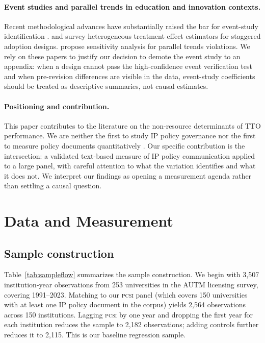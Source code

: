 \documentclass[12pt]{article}
\newcommand{\PCSI}{\textsc{pcsi}}
\begin{document}
\paragraph{Event studies and parallel trends in education and innovation contexts.}
Recent methodological advances have substantially raised the bar for event-study
identification \citep{callaway2021, sunabr2021, goodmanbacon2021, roth2022,
rambachanroth2023, borusyakjaravel2024}. \citet{dechaisemartin2020} and
\citet{dechaisemartin2023} survey heterogeneous treatment effect estimators for staggered
adoption designs. \citet{rothsantanna2023} propose sensitivity analysis for parallel
trends violations. We rely on these papers to justify our decision to demote the event
study to an appendix: when a design cannot pass the high-confidence event verification
test and when pre-revision differences are visible in the data, event-study coefficients
should be treated as descriptive summaries, not causal estimates.

\paragraph{Positioning and contribution.}
This paper contributes to the literature on the non-resource determinants of TTO
performance. We are neither the first to study IP policy governance \citep{coase1960,
williamson1985, herd2019} nor the first to measure policy documents quantitatively
\citep{loughranmcdonald2011, ashchenaidu2022, devlin2019}. Our specific contribution
is the intersection: a validated text-based measure of IP policy communication applied
to a large panel, with careful attention to what the variation identifies and what it
does not. We interpret our findings as opening a measurement agenda rather than settling
a causal question.

\section{Data and Measurement}
\label{sec:data}

\subsection{Sample construction}

Table~\ref{tab:sampleflow} summarizes the sample construction. We begin with 3,507
institution-year observations from 253 universities in the AUTM licensing survey,
covering 1991--2023. Matching to our \PCSI{} panel (which covers 150 universities with
at least one IP policy document in the corpus) yields 2,564 observations across 150
institutions. Lagging \PCSI{} by one year and dropping the first year for each institution
reduces the sample to 2,182 observations; adding controls further reduces it to 2,115.
This is our baseline regression sample.
\end{document}
